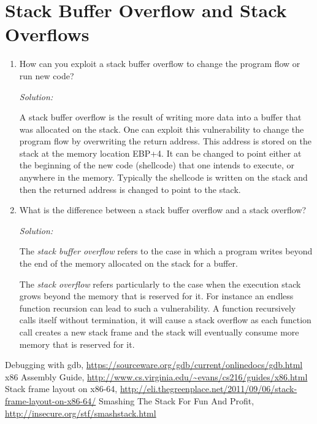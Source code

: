 \documentclass[a4paper,11pt]{article}
\newenvironment{solution}%
{\par{\noindent\small\textit{Solution:}}\vspace{-12pt}\begin{framed}}%
{\end{framed}\par}
\begin{document}
\section*{Stack Buffer Overflow and Stack Overflows}
\begin{enumerate}
\item How can you exploit a stack buffer overflow to change the program flow or
run new code?  
\ifsolution
\begin{solution}
A stack buffer overflow is the result of writing more data into a buffer that was allocated on the stack. One can exploit this vulnerability to change the program flow by overwriting the return address. This address is stored on the stack at the memory location EBP+4. It can be changed to point either at the beginning of the new code (shellcode) that one intends to execute, or anywhere in the memory. Typically the shellcode is written on the stack and then the returned address is changed to point to the stack.
\end{solution}\fi


\item What is the difference between a stack buffer overflow and a stack
  overflow?
\ifsolution\begin{solution}
The \emph{stack buffer overflow} refers to the case in which a program writes beyond the end of the memory allocated on the stack for a buffer.

The \emph{stack overflow} refers particularly to the case when the execution stack grows beyond the memory that is reserved for it. For instance an endless function recursion can lead to such a vulnerability. A function recursively calls itself without termination, it will cause a stack overflow as each function call creates a new stack frame and the stack will eventually consume more memory that is reserved for it.  
\end{solution}\fi 
\end{enumerate}

\begin{thebibliography}{---}
Debugging with gdb, \url{https://sourceware.org/gdb/current/onlinedocs/gdb.html}
x86 Assembly Guide, \url{http://www.cs.virginia.edu/~evans/cs216/guides/x86.html}
Stack frame layout on x86-64,  \url{http://eli.thegreenplace.net/2011/09/06/stack-frame-layout-on-x86-64/}
Smashing The Stack For Fun And Profit,  \url{http://insecure.org/stf/smashstack.html}

\end{thebibliography}
\end{document}
